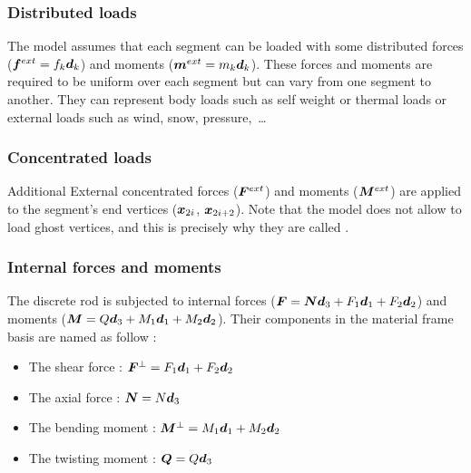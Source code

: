 \subsubsection{Distributed loads}
The model assumes that each segment can be loaded with some distributed forces ($\boldsymbol{f}^{ext} = f_k\boldsymbol{d}_k$) and moments ($\boldsymbol{m}^{ext} = m_k\boldsymbol{d}_k$). These forces and moments are required to be uniform over each segment but can vary from one segment to another. They can represent body loads such as self weight or thermal loads or external loads such as wind, snow, pressure,~\dots

\subsubsection{Concentrated loads}
Additional External concentrated forces ($\boldsymbol{F}^{ext}$) and moments ($\boldsymbol{M}^{ext}$) are applied to the segment's end vertices ($\boldsymbol{x}_{2i}$,  $\boldsymbol{x}_{2i+2}$). Note that the model does not allow to load ghost vertices, and this is precisely why they are called .

 \subsubsection{Internal forces and moments}
The discrete rod is subjected to internal forces ($\boldsymbol{F} = \boldsymbol{N}\boldsymbol{d}_3 + F_1 \boldsymbol{d}_1 + F_2 \boldsymbol{d}_2$) and moments ($\boldsymbol{M} = Q\boldsymbol{d}_3 + M_1 \boldsymbol{d}_1 + M_2 \boldsymbol{d}_2$). Their components in the material frame basis are named as follow :
\begin{itemize}
\item The shear force : $\boldsymbol{F}^{\perp} = F_1 \boldsymbol{d}_1 + F_2 \boldsymbol{d}_2$ 
\item The axial force : $\boldsymbol{N} = N \boldsymbol{d}_3$
\item The bending moment : $\boldsymbol{M}^{\perp} = M_1 \boldsymbol{d}_1 + M_2 \boldsymbol{d}_2$ 
\item The twisting moment : $\boldsymbol{Q} = Q \boldsymbol{d}_3$ 
\end{itemize}

